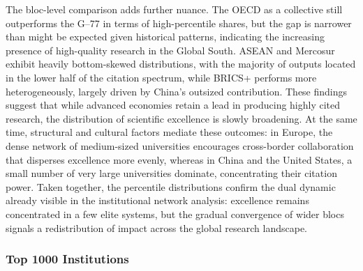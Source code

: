 \documentclass{article}
\begin{document}
The bloc-level comparison adds further nuance. The OECD as a collective still outperforms the G–77 in terms of high-percentile shares, but the gap is narrower than might be expected given historical patterns, indicating the increasing presence of high-quality research in the Global South. ASEAN and Mercosur exhibit heavily bottom-skewed distributions, with the majority of outputs located in the lower half of the citation spectrum, while BRICS+ performs more heterogeneously, largely driven by China’s outsized contribution. These findings suggest that while advanced economies retain a lead in producing highly cited research, the distribution of scientific excellence is slowly broadening. At the same time, structural and cultural factors mediate these outcomes: in Europe, the dense network of medium-sized universities encourages cross-border collaboration that disperses excellence more evenly, whereas in China and the United States, a small number of very large universities dominate, concentrating their citation power. Taken together, the percentile distributions confirm the dual dynamic already visible in the institutional network analysis: excellence remains concentrated in a few elite systems, but the gradual convergence of wider blocs signals a redistribution of impact across the global research landscape.


\subsubsection{Top 1000 Institutions}
\end{document}
